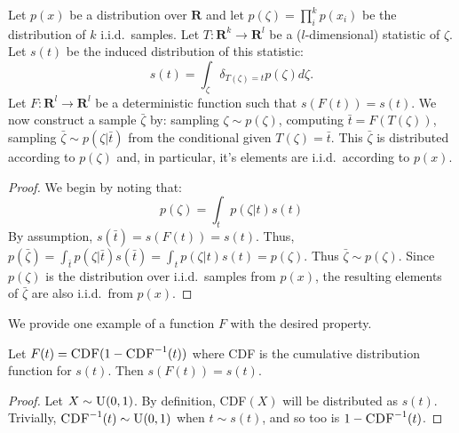 \begin{theorem} Let $p(x)$ be a distribution over $\mathbf{R}$ and let $p(\zeta) = \prod_i^k p(x_i)$ be the distribution of $k$ i.i.d.~samples. Let $T: \mathbf{R}^k \rightarrow \mathbf{R}^l$ be a ($l$-dimensional) statistic of $\zeta$. Let $s(t)$ be the induced distribution of this statistic:  \[s(t) = \int_\zeta \delta_{T(\zeta){=}t} p(\zeta)d\zeta.\]
Let $F: \mathbf{R}^l \rightarrow \mathbf{R}^l$ be a deterministic function such that $s(F(t)) = s(t)$.
We now construct a sample $\bar{\zeta}$ by: sampling $\zeta \sim p(\zeta)$, computing $\bar{t}=F(T(\zeta))$, sampling $\bar{\zeta} \sim p(\zeta|\bar{t})$ from the conditional given $T(\zeta)=\bar{t}$.
This $\bar{\zeta}$ is distributed according to $p(\zeta)$ and, in particular, it's elements are i.i.d.~according to $p(x)$.
\begin{proof}
We begin by noting that:
\begin{equation*}
    p(\zeta) = \int_t p(\zeta|t)s(t)
\label{eqn:1}
\end{equation*}
By assumption, $s(\bar{t}) = s(F(t)) = s(t)$. Thus, $p(\bar{\zeta}) = \int_{\bar{t}} p(\zeta|\bar{t})s(\bar{t}) = \int_{t} p(\zeta|t)s(t) = p(\zeta)$.
Thus $\bar{\zeta} \sim p(\zeta)$.
Since $p(\zeta)$ is the distribution over i.i.d.~samples from $p(x)$, the resulting elements of $\bar{\zeta}$ are also i.i.d.~from $p(x)$.
\end{proof}
\label{theorem:1}
\end{theorem}

We provide one example of a function $F$ with the desired property.

\begin{lem}Let $F(t) = \textsc{CDF}(1 - \textsc{CDF}^{-1}(t))$ where \textsc{CDF} is the cumulative distribution function for $s(t)$. Then $s(F(t))= s(t)$.
\end{lem}
\begin{proof}
Let $X \sim \textsc{U}(0,1)$. By definition, \textsc{CDF}$(X)$ will be distributed as $s(t)$. Trivially, $\textsc{CDF}^{-1}(t) \sim \textsc{U}(0,1)$ when $t \sim s(t)$, and so too is $1-\textsc{CDF}^{-1}(t)$.
\end{proof}

